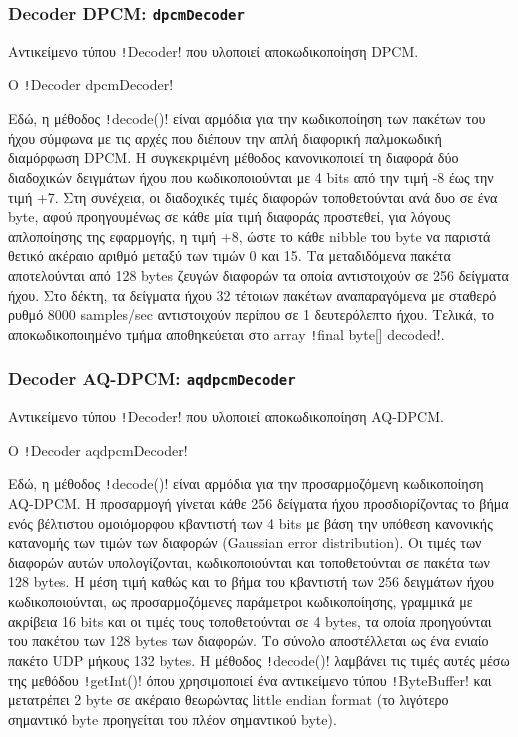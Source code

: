 \subsubsection{Decoder DPCM: \texttt{dpcmDecoder}}\label{section:dpcmDecoder}
Αντικείμενο τύπου \texttt!Decoder! που υλοποιεί αποκωδικοποίηση DPCM.
\begin{code}
\caption{O \texttt!Decoder dpcmDecoder!}
\end{code}

Εδώ, η μέθοδος \texttt!decode()! είναι αρμόδια για την κωδικοποίηση των πακέτων του ήχου σύμφωνα με τις αρχές που διέπουν την απλή διαφορική παλμοκωδική διαμόρφωση DPCM.
Η συγκεκριμένη μέθοδος κανονικοποιεί τη διαφορά δύο διαδοχικών δειγμάτων ήχου που κωδικοποιούνται με 4 bits από την τιμή -8 έως την τιμή +7.
Στη συνέχεια, οι διαδοχικές τιμές διαφορών τοποθετούνται ανά δυο σε ένα byte, αφού προηγουμένως σε κάθε μία τιμή διαφοράς προστεθεί, για λόγους απλοποίησης της εφαρμογής, η τιμή +8, ώστε το κάθε nibble του byte να παριστά θετικό ακέραιο αριθμό μεταξύ των τιμών 0 και 15.
Τα μεταδιδόμενα πακέτα αποτελούνται από 128 bytes ζευγών διαφορών τα οποία αντιστοιχούν σε 256 δείγματα ήχου.
Στο δέκτη, τα δείγματα ήχου 32 τέτοιων πακέτων αναπαραγόμενα με σταθερό ρυθμό 8000 samples/sec αντιστοιχούν περίπου σε 1 δευτερόλεπτο ήχου.
Τελικά, το αποκωδικοποιημένο τμήμα αποθηκεύεται στο array \texttt!final byte[] decoded!.

\subsubsection{Decoder AQ-DPCM: \texttt{aqdpcmDecoder}}\label{section:aqdpcmDecoder}
Αντικείμενο τύπου \texttt!Decoder! που υλοποιεί αποκωδικοποίηση AQ-DPCM.
\begin{code}
\caption{O \texttt!Decoder aqdpcmDecoder!}
\end{code}

Εδώ, η μέθοδος \texttt!decode()! είναι αρμόδια για την προσαρμοζόμενη κωδικοποίηση AQ-DPCM.
Η προσαρμογή γίνεται κάθε 256 δείγματα ήχου προσδιορίζοντας το βήμα ενός βέλτιστου ομοιόμορφου κβαντιστή των 4 bits
με βάση την υπόθεση κανονικής κατανομής των τιμών των διαφορών (Gaussian error distribution).
Οι τιμές των διαφορών αυτών υπολογίζονται, κωδικοποιούνται και τοποθετούνται σε πακέτα των 128 bytes.
Η μέση τιμή καθώς και το βήμα του κβαντιστή των 256 δειγμάτων ήχου κωδικοποιούνται, ως προσαρμοζόμενες παράμετροι κωδικοποίησης,
γραμμικά με ακρίβεια 16 bits και οι τιμές τους τοποθετούνται σε 4 bytes, τα οποία προηγούνται του πακέτου των 128 bytes των διαφορών.
Το σύνολο αποστέλλεται ως ένα ενιαίο πακέτο UDP μήκους 132 bytes.
Η μέθοδος \texttt!decode()! λαμβάνει τις τιμές αυτές μέσω της μεθόδου \texttt!getInt()! όπου χρησιμοποιεί ένα αντικείμενο τύπου \texttt!ByteBuffer! και μετατρέπει 2 byte σε ακέραιο θεωρώντας little endian format (το λιγότερο σημαντικό byte προηγείται του πλέον σημαντικού byte).

